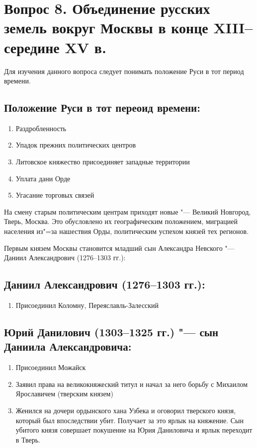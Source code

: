 \section{Вопрос 8. Объединение русских земель вокруг Москвы в конце XIII--середине XV в.}

Для изучения данного вопроса следует понимать положение Руси в тот период времени.

\subsection{Положение Руси в тот переоид времени:}

\begin{enumerate}
    \item{ Раздробленность}
    \item{ Упадок прежних политических центров}
    \item{ Литовское княжество присоединяет западные территории}
    \item{ Уплата дани Орде}
    \item{ Угасание торговых связей}
\end{enumerate}

На смену старым политическим центрам приходят новые "--- Великий Новгород, Тверь, Москва. Это обусловлено их географическим положением, миграцией населения из"=за нашествия Орды, политическим успехом князей тех регионов.

Первым князем Москвы становится младший сын Александра Невского "--- Даниил Александрович (1276--1303 гг.):

\subsection{Даниил Александрович (1276--1303 гг.):}

\begin{enumerate}
    \item{Присоединил Коломну, Переяславль-Залесский}
\end{enumerate}

\subsection{Юрий Данилович (1303--1325 гг.) "--- сын Даниила Александровича:}

\begin{enumerate}
    \item{ Присоединил Можайск}
    \item{ Заявил права на великокняжеский титул и начал за него борьбу с Михаилом Ярославичем (тверским князем)}
    \item{ Женился на дочери ордынского хана Узбека и оговорил тверского князя, который был впоследствии убит. Получает за это ярлык на княжение. Сын убитого князя совершает покушение на Юрия Даниловича и ярлык переходит в Тверь.}
\end{enumerate}

